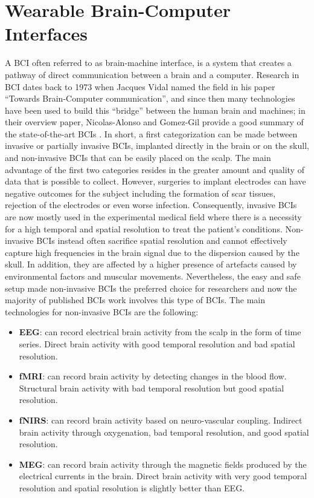 \section{Wearable Brain-Computer Interfaces}
\label{sec:wearable_bci}
A \ac{BCI} often referred to as brain-machine interface, is a system that creates a pathway of direct communication between a brain and a computer. Research in \ac{BCI}  dates back to 1973 when Jacques Vidal named the field in his paper “Towards Brain-Computer communication”, and since then many technologies have been used to build this “bridge” between the human brain and machines; in their overview paper, Nicolas-Alonso and Gomez-Gil provide a good summary of the state-of-the-art \ac{BCIs} \cite{nicolas-alonso_brain_2012}. In short, a first categorization can be made between invasive or partially invasive \ac{BCIs}, implanted directly in the brain or on the skull, and non-invasive \ac{BCIs} that can be easily placed on the scalp. The main advantage of the first two categories resides in the greater amount and quality of data that is possible to collect. However, surgeries to implant electrodes can have negative outcomes for the subject including the formation of scar tissues, rejection of the electrodes or even worse infection. Consequently, invasive \ac{BCIs} are now mostly used in the experimental medical field where there is a necessity for a high temporal and spatial resolution to treat the patient's conditions. Non-invasive \ac{BCIs} instead often sacrifice spatial resolution and cannot effectively capture high frequencies in the brain signal due to the dispersion caused by the skull. In addition, they are affected by a higher presence of artefacts caused by environmental factors and muscular movements. Nevertheless, the easy and safe setup made non-invasive \ac{BCIs} the preferred choice for researchers and now the majority of published \ac{BCIs} work involves this type of \ac{BCIs}. The main technologies for non-invasive \ac{BCIs} are the following:
\begin{itemize}
\item \textbf{\ac{EEG}}: can record electrical brain activity from the scalp in the form of time series. Direct brain activity with good temporal resolution and bad spatial resolution.
\item \textbf{\ac{fMRI}}: can record brain activity by detecting changes in the blood flow. Structural brain activity with bad temporal resolution but good spatial resolution.
\item \textbf{\ac{fNIRS}}: can record brain activity based on neuro-vascular coupling. Indirect brain activity through oxygenation, bad temporal resolution, and good spatial resolution.
\item \textbf{ \ac{MEG}}: can record brain activity through the magnetic fields produced by the electrical currents in the brain. Direct brain activity with very good temporal resolution and spatial resolution is slightly better than EEG.
\end{itemize}
